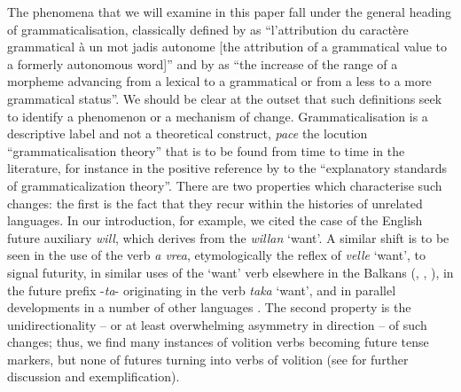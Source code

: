 \documentclass[output=paper]{langsci/langscibook}
\begin{document}
The phenomena that we will examine in this paper fall under the general heading
of grammaticalisation, classically defined by \citet[131]{Meillet12} as
\enquote{l'attribution du caract\`ere grammatical \`a un mot jadis autonome
[the attribution of a grammatical value to a formerly autonomous word]} and by
\textcite[69]{Kurylowicz65} as \enquote{the increase of the range of a morpheme
advancing from a lexical to a grammatical or from a less to a more grammatical
status}.  We should be clear at the outset that such definitions seek to
identify a phenomenon or a mechanism of change. Grammaticalisation is a
descriptive label and not a theoretical construct, \emph{pace} the locution
\enquote{grammaticalisation theory} that is to be found from time to time in
the literature, for instance in the positive reference by
\textcite[318]{Haspelmath89} to the \enquote{explanatory standards of
grammaticalization theory}. There are two properties which characterise such
changes: the first is the fact that they recur within the histories of
unrelated languages. In our introduction, for example, we cited the case of the
English future auxiliary \emph{will}, which derives from the 
\emph{willan} \enquote*{want}. A similar shift is to be seen in the use of the
 verb \emph{a vrea}, etymologically the reflex of 
\emph{velle} \enquote*{want}, to signal futurity, in similar uses of the
\enquote*{want} verb elsewhere in the Balkans (, ,
), in the  future prefix -\emph{ta}- originating in the
verb \emph{taka} \enquote*{want}, and in parallel developments in a number of
other languages \citep{HeinKute02}.  The second property is the
unidirectionality -- or at least overwhelming asymmetry in direction -- of such
changes; thus, we find many instances of volition verbs becoming future tense
markers, but none of futures turning into verbs of volition (see
\citealt{BorjVinc11} for further discussion and exemplification).
\end{document}
